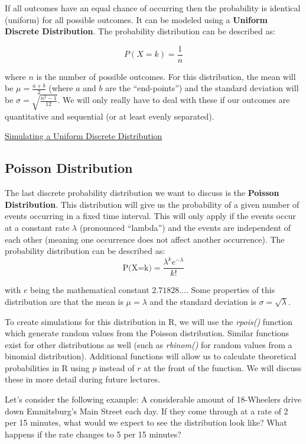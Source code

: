 \documentclass[
  letterpaper,
  DIV=11,
  numbers=noendperiod]{scrreprt}
\begin{document}
If all outcomes have an equal chance of occurring then the probability
is identical (uniform) for all possible outcomes. It can be modeled
using a \textbf{Uniform Discrete Distribution}. The probability
distribution can be described as:

\[ P(X=k)=\frac{1}{n}\]

where \(n\) is the number of possible outcomes. For this distribution,
the mean will be \(\mu=\frac{a+b}{2}\) (where \(a\) and \(b\) are the
``end-points'') and the standard deviation will be
\(\sigma=\sqrt{\frac{n^2-1}{12}}\). We will only really have to deal
with these if our outcomes are quantitative and sequential (or at least
evenly separated).

\begin{watch}{}{}
    \href{https://youtu.be/WWIZw8LfBI8}{Simulating a Uniform Discrete Distribution}
\end{watch}

\subsection{Poisson Distribution}\label{poisson-distribution}

The last discrete probability distribution we want to discuss is the
\textbf{Poisson Distribution}. This distribution will give us the
probability of a given number of events occurring in a fixed time
interval. This will only apply if the events occur at a constant rate
\(\lambda\) (pronounced ``lambda'') and the events are independent of
each other (meaning one occurrence does not affect another occurrence).
The probability distribution can be described as:
\[ \text{P(X=k)}=\frac{\lambda^ke^{-\lambda}}{k!}\]

with \(e\) being the mathematical constant \(2.71828\dots\). Some
properties of this distribution are that the mean is \(\mu=\lambda\) and
the standard deviation is \(\sigma = \sqrt{\lambda}\).

To create simulations for this distribution in R, we will use the
\emph{rpois()} function which generate random values from the Poisson
distribution. Similar functions exist for other distributions as well
(such as \emph{rbinom()} for random values from a binomial
distribution). Additional functions will allow us to calculate
theoretical probabilities in R using \(p\) instead of \(r\) at the front
of the function. We will discuss these in more detail during future
lectures.

Let's consider the following example: A considerable amount of
18-Wheelers drive down Emmitsburg's Main Street each day. If they come
through at a rate of 2 per 15 minutes, what would we expect to see the
distribution look like? What happens if the rate changes to 5 per 15
minutes?
\end{document}
